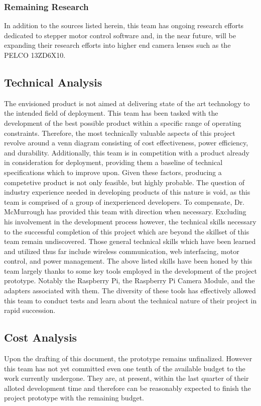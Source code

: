 \subsubsection{Remaining Research}
In addition to the sources listed herein, this team has ongoing research efforts dedicated to stepper motor control software and, in the near future, will be expanding their research efforts into higher end camera lenses such as the PELCO 13ZD6X10.
\subsection{Technical Analysis}
The envisioned product is not aimed at delivering state of the art technology to the intended field of deployment. This team has been tasked with the development of the best possible product within a specific range of operating constraints. Therefore, the most technically valuable aspects of this project revolve around a venn diagram consisting of cost effectiveness, power efficiency, and durability. Additionally, this team is in competition with a product already in consideration for deployment, providing them a baseline of technical specifications which to improve upon. Given these factors, producing a competetive product is not only feasible, but highly probable.
The question of industry experience needed in developing products of this nature is void, as this team is comprised of a group of inexperienced developers. To compensate, Dr. McMurrough has provided this team with direction when necessary. Excluding his involvement in the development process however, the technical skills necessary to the successful completion of this project which are beyond the skillset of this team remain undiscovered. Those general technical skills which have been learned and utilized thus far include wireless communication, web interfacing, motor control, and power management.
The above listed skills have been honed by this team largely thanks to some key tools employed in the development of the project prototype. Notably the Raspberry Pi, the Raspberry Pi Camera Module, and the adapters associated with them. The diversity of these tools has effectively allowed this team to conduct tests and learn about the technical nature of their project in rapid succession.  
\subsection{Cost Analysis}
Upon the drafting of this document, the prototype remains unfinalized. However this team has not yet committed even one tenth of the available budget to the work currently undergone. They are, at present, within the last quarter of their alloted development time and therefore can be reasonably expected to finish the project prototype with the remaining budget.

